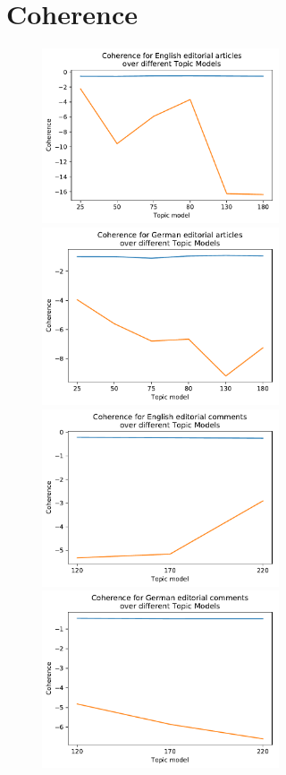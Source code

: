 \section{Coherence}
\begin{figure}[t]
	\begin{minipage}{0.5\textwidth}
		\centering
		\includegraphics[width=7cm]{gfx/Eval_IC/English_Editorial_Coherence.pdf}
	\end{minipage}
	\begin{minipage}{0.5\textwidth}
		\centering
		\includegraphics[width=7cm]{gfx/Eval_IC/German_Editorial_Coherence.pdf}
	\end{minipage}%
	\begin{minipage}{0.5\textwidth}
		\centering
		\includegraphics[width=7cm]{gfx/Eval_IC/Eng_comments_Coherence.pdf}
	\end{minipage}
	\begin{minipage}{0.5\textwidth}
		\centering
		\includegraphics[width=7cm]{gfx/Eval_IC/German_comments_Coherence.pdf}

\end{minipage}
\end{figure}
